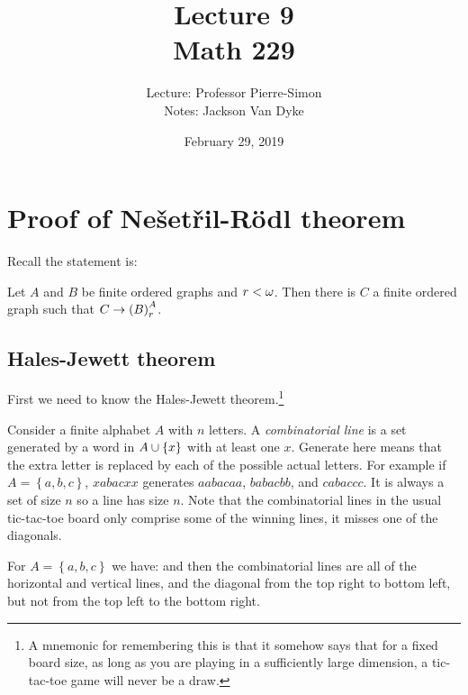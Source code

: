 \documentclass{amsart}
\begin{document}
\title{Lecture 9\\Math 229}
\author{Lecture: Professor Pierre-Simon\\Notes: Jackson Van Dyke}
\date{February 29, 2019}
\maketitle

\section{Proof of Ne\v{s}et\v{r}il-R\"odl theorem}

Recall the statement is:

\begin{thm}
Let $A$ and $B$ be finite ordered graphs and $r<\omega$.
Then there is $C$ a finite ordered graph
such that $C\rightarrow \left( B \right)_r^A$.
\label{thm:nr}
\end{thm}

\subsection{Hales-Jewett theorem}

First we need to know the Hales-Jewett theorem.\footnote{
A mnemonic for remembering this is that it somehow says that for a fixed board size, 
as long as you are playing in a sufficiently large dimension, a tic-tac-toe
game will never be a draw.}

Consider a finite alphabet $A$ with $n$ letters. A \emph{combinatorial line} is a set
generated by a word in $A\cup\left\{ x \right\}$ with at least one $x$.
Generate here means that the extra letter is replaced by each of the
possible actual letters. For example if $A = \left\{ a,b,c \right\}$, 
$xabacxx$ generates $aabacaa$, $babacbb$, and $cabaccc$.
It is always a set of size $n$ so a line has size $n$.
Note that the combinatorial lines in the usual tic-tac-toe board only comprise some of the
winning lines, it misses one of the diagonals.

\begin{exm}
For $A = \left\{ a,b,c \right\}$ we have:
and then the combinatorial lines are all of the horizontal and vertical lines, and the
diagonal from the top right to bottom left, but not from the top left to the bottom right.
\end{exm}
\end{document}

